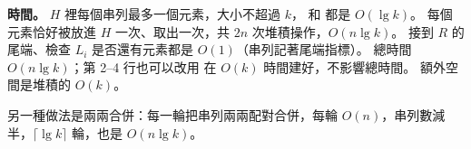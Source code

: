 \begin{pastsoln}
\textbf{時間。} $H$ 裡每個串列最多一個元素，大小不超過 $k$， 和 
都是 $O(\lg k)$。 每個元素恰好被放進 $H$ 一次、取出一次，共 $2n$ 次堆積操作，$O(n \lg k)$。 接到 $R$
的尾端、檢查 $L_i$ 是否還有元素都是 $O(1)$（串列記著尾端指標）。 總時間 $O(n \lg k)$；第 2--4 行也可以改用
 在 $O(k)$ 時間建好，不影響總時間。 額外空間是堆積的 $O(k)$。

另一種做法是兩兩合併：每一輪把串列兩兩配對合併，每輪 $O(n)$，串列數減半，$\lceil \lg k \rceil$ 輪，也是
$O(n \lg k)$。
\end{pastsoln}
